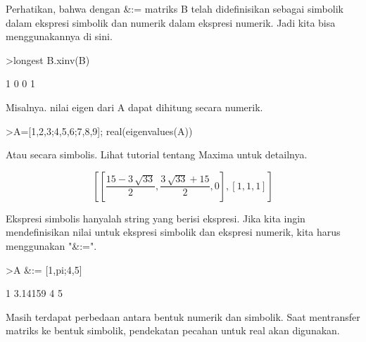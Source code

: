 \documentclass{article}
\begin{document}
\begin{eulernotebook}
\begin{eulercomment}
\begin{eulercomment}
\begin{eulercomment}
\begin{eulercomment}
\begin{eulercomment}
\begin{eulercomment}
\begin{eulercomment}
Perhatikan, bahwa dengan \&:= matriks B telah didefinisikan sebagai
simbolik dalam ekspresi simbolik dan numerik dalam ekspresi numerik.
Jadi kita bisa menggunakannya di sini.
\end{eulercomment}
\begin{eulerprompt}
>longest B.xinv(B)
\end{eulerprompt}
\begin{euleroutput}
                        1                       0 
                        0                       1 
\end{euleroutput}
\begin{eulercomment}
Misalnya. nilai eigen dari A dapat dihitung secara numerik.
\end{eulercomment}
\begin{eulerprompt}
>A=[1,2,3;4,5,6;7,8,9]; real(eigenvalues(A))
\end{eulerprompt}
\begin{euleroutput}
  [16.1168,  -1.11684,  0]
\end{euleroutput}
\begin{eulercomment}
Atau secara simbolis. Lihat tutorial tentang Maxima untuk detailnya.
\end{eulercomment}
\begin{eulerformula}
\[
\left[ \left[ \frac{15-3\,\sqrt{33}}{2} , \frac{3\,\sqrt{33}+15}{2}   , 0 \right]  , \left[ 1 , 1 , 1 \right]  \right] 
\]
\end{eulerformula}
\begin{eulercomment}
Ekspresi simbolis hanyalah string yang berisi ekspresi. Jika kita
ingin mendefinisikan nilai untuk ekspresi simbolik dan ekspresi
numerik, kita harus menggunakan "\&:=".
\end{eulercomment}
\begin{eulerprompt}
>A &:= [1,pi;4,5]
\end{eulerprompt}
\begin{euleroutput}
              1       3.14159 
              4             5 
\end{euleroutput}
\begin{eulercomment}
Masih terdapat perbedaan antara bentuk numerik dan simbolik. Saat
mentransfer matriks ke bentuk simbolik, pendekatan pecahan untuk real
akan digunakan.
\end{eulercomment}
\begin{eulerprompt}

\end{eulerprompt}
\end{eulercomment}
\end{eulercomment}
\end{eulercomment}
\end{eulercomment}
\end{eulercomment}
\end{eulercomment}
\end{eulernotebook}
\end{document}
